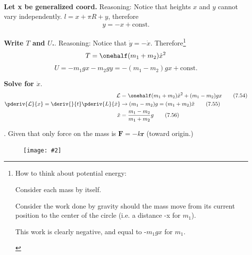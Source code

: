 \documentclass[10pt, twocolumn]{article}
\newcommand\myfig[2][0.3\textwidth]{\begin{figure}[h!]\centering\texttt{[image: \#2]}\end{figure}}
\newcommand{\myspace}{\vspace{3\bigskipamount}}
\newcommand\p{\Needspace{10\baselineskip} \noindent}
\newcommand\tlab[1]{\tag{#1}\label{#1}}
\begin{document}
\begin{compactitem}
	\item \textbf{Let x be generalized coord.} Reasoning: Notice that heights $x$ and $y$ cannot vary independently. $l = x + \pi R + y$, therefore
	\begin{align}
		y = -x + \text{const.} \tlab{7.53}
	\end{align}
	
	\item \textbf{Write $T$ and $U$.}. Reasoning: Notice that $\dot y = - \dot x$. Therefore\footnote{How to think about potential energy: 
		\begin{compactitem}
			\item Consider each mass by itself.
			\item Consider the work done by gravity should the mass move from its current position to the center of the circle (i.e. a distance -x for $m_1$). 
			\item This work is clearly negative, and equal to -$m_1 g x$ for $m_1$. 
		\end{compactitem}
			} %
	$$ T = \onehalf (m_1 + m_2) \dot x^2$$
	$$ U = - m_1 g x - m_2 g y = - ( m_1 - m_2 ) g x + \text {const.} $$
	
	
	\item \textbf{Solve for $\ddot x$}. 
	\begin{align}
		\mathcal L &= \onehalf (m_1 + m_2) \dot x^2 + ( m_1 - m_2 ) g x \tlab{7.54} \\
		\pderiv{\mathcal L}{x} = \deriv{}{t}\pderiv{L}{\dot x} &\rightarrow   ( m_1 - m_2 ) g  = (m_1 + m_2) \ddot x \tlab{7.55} \\
		\ddot x &= \dfrac{m_1 - m_2}{m_1 + m_2} g \tlab{7.56}
	\end{align}
\end{compactitem}

\myspace
\p {}. Given that only force on the mass is $\bm F = -k \bm r$ (toward origin.)
\myfig[0.15\textwidth]{Cylinder.PNG}
\end{document}
